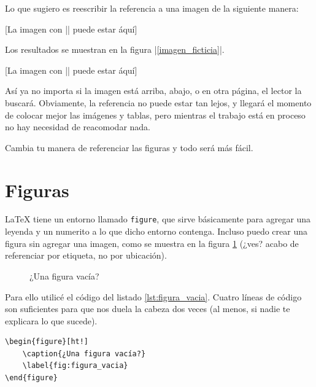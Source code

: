 Lo que sugiero es reescribir la referencia a una imagen de la siguiente manera:

\begin{displayquote}
{[La imagen con |\label{imagen_ficticia}| puede estar áquí]}

Los resultados se muestran en la figura |\ref{imagen_ficticia}|.

[La imagen con |\label{imagen_ficticia}| puede estar áquí]
\end{displayquote}

Así ya no importa si la imagen está arriba, abajo, o en otra página, el lector la buscará. Obviamente, la referencia no puede estar tan lejos, y llegará el momento de colocar mejor las imágenes y tablas, pero mientras el trabajo está en proceso no hay necesidad de reacomodar nada.

Cambia tu manera de referenciar las figuras y todo será más fácil.



\section{Figuras}
\label{sec:figuras}


\LaTeX{} tiene un entorno llamado \texttt{figure}, que sirve básicamente para agregar una leyenda y un numerito a lo que dicho entorno contenga. Incluso puedo crear una figura sin agregar una imagen, como se muestra en la figura \ref{fig:figura_vacia} (¿ves? acabo de referenciar por etiqueta, no por ubicación).

\begin{figure}[ht!]
	\caption{¿Una figura vacía?}
	\label{fig:figura_vacia}
\end{figure}

Para ello utilicé el código del listado \ref{lst:figura_vacia}. Cuatro líneas de código son suficientes para que nos duela la cabeza dos veces (al menos, si nadie te explicara lo que sucede).

\begin{lstlisting}[style=latex,caption={Código para una figura vacía.},label=lst:figura_vacia]
\begin{figure}[ht!]
	\caption{¿Una figura vacía?}
	\label{fig:figura_vacia}
\end{figure}
\end{lstlisting}




